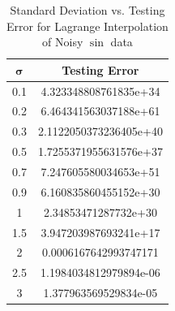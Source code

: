 \documentclass[a4paper]{article}
\theoremstyle{definition}
\newenvironment{soln}{
    \leavevmode\color{blue}\ignorespaces
}{}
\begin{document}
\begin{soln}
    \begin{table}[h]
        \centering
        \begin{tabular}{|c|c|}
            \hline
            $\mathbf{\sigma}$ & \textbf{Testing Error} \\
            \hline
            0.1 & 4.323348808761835e+34 \\
            \hline
            0.2 & 6.464341563037188e+61 \\
            \hline
            0.3 & 2.1122050373236405e+40 \\
            \hline
            0.5 & 1.7255371955631576e+37 \\
            \hline
            0.7 & 7.247605580034653e+51 \\
            \hline
            0.9 & 6.160835860455152e+30 \\
            \hline
            1 & 2.34853471287732e+30 \\
            \hline
            1.5 & 3.947203987693241e+17 \\
            \hline
            2 & 0.0006167642993747171 \\
            \hline
            2.5 & 1.1984034812979894e-06 \\
            \hline
            3 & 1.377963569529834e-05 \\ 
            \hline
        \end{tabular}
        \caption{Standard Deviation vs. Testing Error for Lagrange Interpolation of Noisy $\sin$ data}
        \label{tab:4}
    \end{table}
\end{soln}


\end{document}
